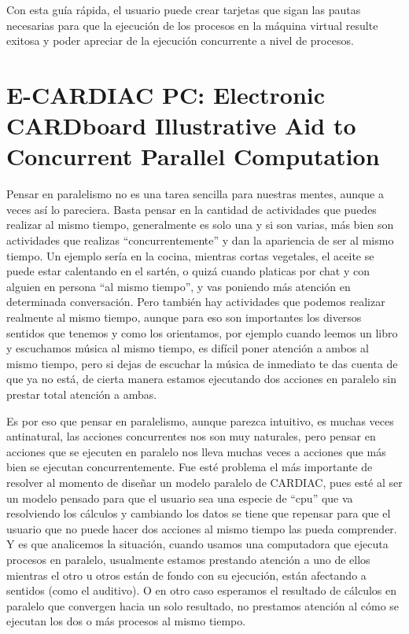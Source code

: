 \documentclass[letterpaper,12pt,oneside]{book}
\begin{document}
\begin{enumerate}
			\end{enumerate}
			
			
			Con esta guía rápida, el usuario puede crear tarjetas que sigan las pautas necesarias para que la ejecución de los procesos en
			la máquina virtual resulte exitosa y poder apreciar de la ejecución concurrente a nivel de procesos.
	
	\clearpage
	 \section{E-CARDIAC PC: Electronic CARDboard Illustrative Aid to
	 Concurrent Parallel Computation}
	 
	 Pensar en paralelismo no es una tarea sencilla para nuestras mentes, aunque a veces así lo pareciera. Basta pensar en la cantidad de actividades
	 que puedes realizar al mismo tiempo, generalmente es solo una y si son varias, más bien son actividades que realizas ``concurrentemente'' y
	 dan la apariencia de ser al mismo tiempo. Un ejemplo sería en la cocina, mientras cortas vegetales, el aceite se puede estar calentando en el sartén,
	 o quizá cuando platicas por chat y con alguien en persona ``al mismo tiempo'', y vas poniendo más atención en determinada conversación. Pero también
	 hay actividades que podemos realizar realmente al mismo tiempo, aunque para eso son importantes los diversos sentidos que tenemos y como los orientamos, por
	 ejemplo cuando leemos un libro y escuchamos música al mismo tiempo, es difícil poner atención a ambos al mismo tiempo, pero si dejas de escuchar la música
	 de inmediato te das cuenta de que ya no está, de cierta manera estamos ejecutando dos acciones en paralelo sin prestar total atención a ambas.
	 
	 Es por eso que pensar en paralelismo, aunque parezca intuitivo, es muchas veces antinatural, las acciones concurrentes nos son muy naturales,
	 pero pensar en acciones que se ejecuten en paralelo nos lleva muchas veces a acciones que más bien se ejecutan concurrentemente. Fue esté problema
	 el más importante de resolver al momento de diseñar un modelo paralelo de CARDIAC, pues esté al ser un modelo pensado para que el usuario sea
	 una especie de ``cpu'' que va resolviendo los cálculos y cambiando los datos se tiene que repensar para que el usuario que no puede hacer dos acciones al
	 mismo tiempo las pueda comprender. Y es que analicemos la situación, cuando usamos una computadora que ejecuta procesos en paralelo, usualmente estamos prestando
	 atención a uno de ellos mientras el otro u otros están de fondo con su ejecución, están afectando a sentidos (como el auditivo). O en otro caso esperamos el resultado
	 de cálculos en paralelo que convergen hacia un solo resultado, no prestamos atención al cómo se ejecutan los dos o más procesos al mismo tiempo.
	 
\end{document}
